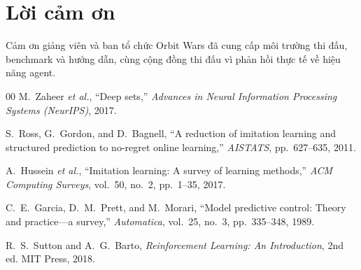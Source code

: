 \documentclass[conference]{IEEEtran}
\begin{document}
\section*{Lời cảm ơn}

Cảm ơn giảng viên và ban tổ chức Orbit Wars đã cung cấp môi trường thi đấu, benchmark và hướng dẫn, cùng cộng đồng thi đấu vì phản hồi thực tế về hiệu năng agent.

\begin{thebibliography}{00}
M.~Zaheer \textit{et al.},
``Deep sets,''
\textit{Advances in Neural Information Processing Systems (NeurIPS)}, 2017.

S.~Ross, G.~Gordon, and D.~Bagnell,
``A reduction of imitation learning and structured prediction to no-regret online learning,''
\textit{AISTATS}, pp.~627--635, 2011.

A.~Hussein \textit{et al.},
``Imitation learning: A survey of learning methods,''
\textit{ACM Computing Surveys}, vol.~50, no.~2, pp.~1--35, 2017.

C.~E.~Garcia, D.~M.~Prett, and M.~Morari,
``Model predictive control: Theory and practice---a survey,''
\textit{Automatica}, vol.~25, no.~3, pp.~335--348, 1989.

R.~S.~Sutton and A.~G.~Barto,
\textit{Reinforcement Learning: An Introduction}, 2nd ed.
MIT Press, 2018.
\end{thebibliography}
\end{document}
